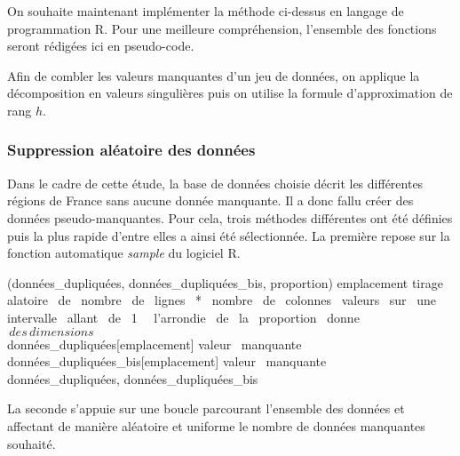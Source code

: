 \documentclass[12pt, openany, fleqn, french]{article}
\begin{document}
    On souhaite maintenant implémenter la méthode ci-dessus en langage de programmation R. Pour une meilleure compréhension, l'ensemble des fonctions seront rédigées ici en pseudo-code.
    
    Afin de combler les valeurs manquantes d'un jeu de données, on applique la décomposition en valeurs singulières puis on utilise la formule d'approximation de rang $h$.
    

\subsubsection{Suppression aléatoire des données}

Dans le cadre de cette étude, la base de données choisie décrit les différentes régions de France sans aucune donnée manquante. Il a donc fallu créer des données pseudo-manquantes. Pour cela, trois méthodes différentes ont été définies puis la plus rapide d'entre elles a ainsi été sélectionnée. La première repose sur la fonction automatique \textit{sample} du logiciel R. \\ 

    \begin{algorithm}[H]
    \footnotesize
{} {(données\_dupliquées, données\_dupliquées\_bis, proportion)}
    \State emplacement \gets tirage \, alatoire \, de \, nombre \, de \, lignes \, * \, nombre \, de \, colonnes \, valeurs \, sur \, une \, intervalle \, allant \, de \, 1 \,  \, l'arrondie \, de \, la \, proportion \, donne \\ $\, des \, dimensions$\\
    \State données\_dupliquées[emplacement] \gets valeur \, manquante\\
    \State données\_dupliquées\_bis[emplacement] \gets valeur \, manquante\\
    \State \Return données\_dupliquées, données\_dupliquées\_bis\\
    \EndFunction
    \end{algorithm}

    \vspace{0.5cm}
    La seconde s'appuie sur une boucle parcourant l'ensemble des données et affectant de manière aléatoire et uniforme le nombre de données manquantes souhaité.
    
\end{document}
